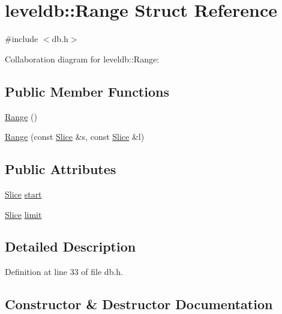\hypertarget{structleveldb_1_1_range}{}\section{leveldb\+:\+:Range Struct Reference}
\label{structleveldb_1_1_range}


{\ttfamily \#include $<$db.\+h$>$}



Collaboration diagram for leveldb\+:\+:Range\+:
\subsection*{Public Member Functions}
\begin{DoxyCompactItemize}
\item 
\hyperlink{structleveldb_1_1_range_af73eb85edfde053ebc456cb08f4d3ec1}{Range} ()
\item 
\hyperlink{structleveldb_1_1_range_a797d5e3b58cc615dfb805965d06bdcbf}{Range} (const \hyperlink{classleveldb_1_1_slice}{Slice} \&s, const \hyperlink{classleveldb_1_1_slice}{Slice} \&l)
\end{DoxyCompactItemize}
\subsection*{Public Attributes}
\begin{DoxyCompactItemize}
\item 
\hyperlink{classleveldb_1_1_slice}{Slice} \hyperlink{structleveldb_1_1_range_ad80a55e20eb7d864d497e8f94953c00d}{start}
\item 
\hyperlink{classleveldb_1_1_slice}{Slice} \hyperlink{structleveldb_1_1_range_a9c45c46ac20a1c86c265f1f9c35d6632}{limit}
\end{DoxyCompactItemize}


\subsection{Detailed Description}


Definition at line 33 of file db.\+h.



\subsection{Constructor \& Destructor Documentation}
\hypertarget{structleveldb_1_1_range_af73eb85edfde053ebc456cb08f4d3ec1}{}
